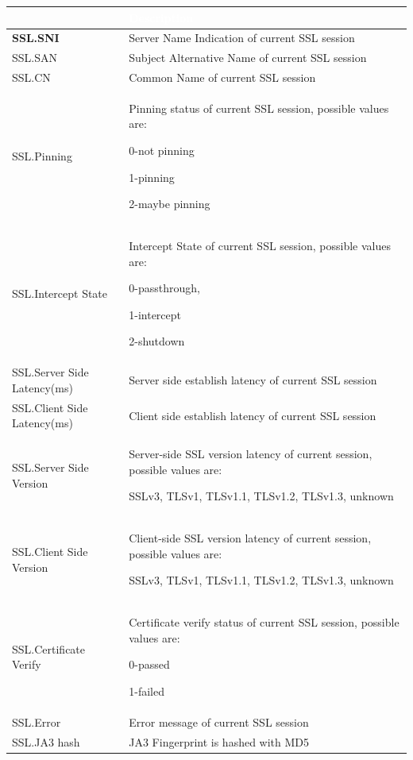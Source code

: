 \begin{longtable}{p{}|p{}}   
    \rowcolor{black}\multicolumn{1}{l!\vlinewhite}{\textcolor{white}{Field}}  & \textcolor{white}{Description} \\\hline
    \textbf{SSL.SNI} &	Server Name Indication of current SSL session \\\hline
    SSL.SAN &	Subject Alternative Name of current SSL session \\\hline
    SSL.CN &	Common Name of current SSL session \\\hline
    SSL.Pinning &	Pinning status of current SSL session, possible values are:


                    0-not pinning 


                    1-pinning 


                    2-maybe pinning \\\hline
    SSL.Intercept State &	Intercept State of current SSL session, possible values are:


                            0-passthrough,


                            1-intercept


                            2-shutdown \\\hline
    \tabincell{l}{SSL.Server Side\\ Latency(ms)} &	Server side establish latency of current SSL session \\\hline
    \tabincell{l}{SSL.Client Side\\ Latency(ms)} &	Client side establish latency of current SSL session \\\hline
    SSL.Server Side Version &	Server-side SSL version latency of current session, possible values are:


                                SSLv3, TLSv1, TLSv1.1, TLSv1.2, TLSv1.3, unknown \\\hline
    SSL.Client Side Version &	Client-side SSL version latency of current session, possible values are:


                                SSLv3, TLSv1, TLSv1.1, TLSv1.2, TLSv1.3, unknown \\\hline
    SSL.Certificate Verify &	Certificate verify status of current SSL session, possible values are:


                                0-passed


                                1-failed \\\hline
    SSL.Error &	Error message of current SSL session \\\hline
    SSL.JA3 hash &	JA3 Fingerprint is hashed with MD5 \\\hline                                                               
\end{longtable}

